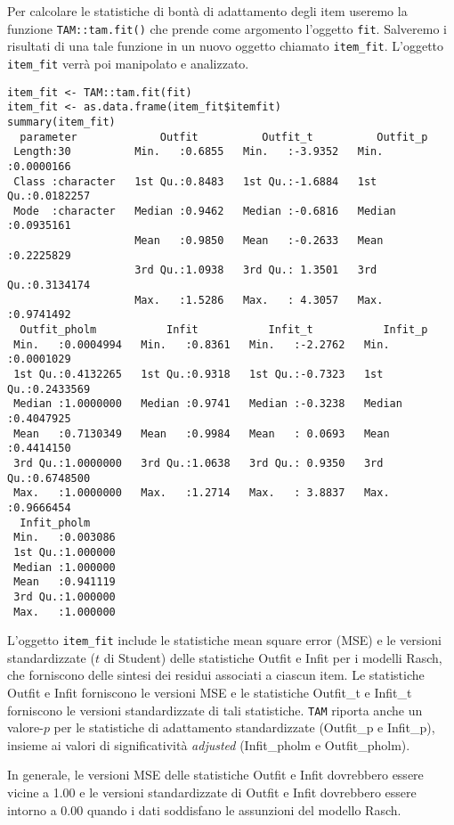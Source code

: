 Per calcolare le statistiche di bontà di adattamento degli item useremo la funzione \texttt{TAM::tam.fit()} che prende come argomento l'oggetto \texttt{fit}. 
Salveremo i risultati di una tale funzione in un nuovo oggetto chiamato \texttt{item\_fit}.
L'oggetto \texttt{item\_fit} verrà poi manipolato e analizzato.

\begin{lstlisting} 
item_fit <- TAM::tam.fit(fit) 
item_fit <- as.data.frame(item_fit$itemfit)
summary(item_fit)
  parameter             Outfit          Outfit_t          Outfit_p        
 Length:30          Min.   :0.6855   Min.   :-3.9352   Min.   :0.0000166  
 Class :character   1st Qu.:0.8483   1st Qu.:-1.6884   1st Qu.:0.0182257  
 Mode  :character   Median :0.9462   Median :-0.6816   Median :0.0935161  
                    Mean   :0.9850   Mean   :-0.2633   Mean   :0.2225829  
                    3rd Qu.:1.0938   3rd Qu.: 1.3501   3rd Qu.:0.3134174  
                    Max.   :1.5286   Max.   : 4.3057   Max.   :0.9741492  
  Outfit_pholm           Infit           Infit_t           Infit_p         
 Min.   :0.0004994   Min.   :0.8361   Min.   :-2.2762   Min.   :0.0001029  
 1st Qu.:0.4132265   1st Qu.:0.9318   1st Qu.:-0.7323   1st Qu.:0.2433569  
 Median :1.0000000   Median :0.9741   Median :-0.3238   Median :0.4047925  
 Mean   :0.7130349   Mean   :0.9984   Mean   : 0.0693   Mean   :0.4414150  
 3rd Qu.:1.0000000   3rd Qu.:1.0638   3rd Qu.: 0.9350   3rd Qu.:0.6748500  
 Max.   :1.0000000   Max.   :1.2714   Max.   : 3.8837   Max.   :0.9666454  
  Infit_pholm      
 Min.   :0.003086  
 1st Qu.:1.000000  
 Median :1.000000  
 Mean   :0.941119  
 3rd Qu.:1.000000  
 Max.   :1.000000 
\end{lstlisting} 
L'oggetto \texttt{item\_fit} include le statistiche mean square error (MSE) e le versioni standardizzate ($t$ di Student) delle statistiche Outfit e Infit per i modelli Rasch, che forniscono delle sintesi dei residui associati a ciascun item. 
Le statistiche Outfit e Infit forniscono le versioni MSE e le statistiche Outfit\_t e Infit\_t forniscono le versioni standardizzate di tali statistiche. 
\texttt{TAM} riporta anche un valore-$p$ per le statistiche di adattamento standardizzate (Outfit\_p e Infit\_p), insieme ai valori di significatività \emph{adjusted} (Infit\_pholm e Outfit\_pholm).

In generale, le versioni MSE delle statistiche Outfit e Infit dovrebbero essere vicine a 1.00 e le versioni standardizzate di Outfit e Infit dovrebbero essere intorno a 0.00 quando i dati soddisfano le assunzioni del modello Rasch. 

